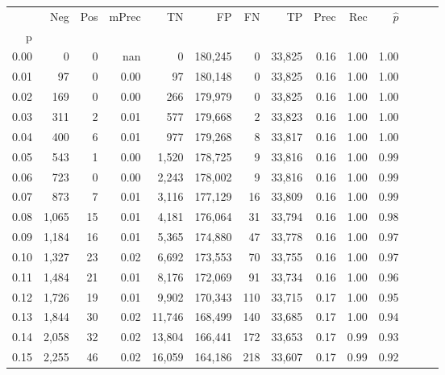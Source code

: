 \begin{tabular}{rrrrrrrrrrrrrr}
\toprule
{} &    Neg &  Pos & mPrec &       TN &       FP &      FN &      TP &  Prec &   Rec & $\hat{p}$ \\
p    &        &      &       &          &          &         &         &       &       &           \\
\midrule
0.00 &      0 &    0 &   nan &        0 &  180,245 &       0 &  33,825 &  0.16 &  1.00 &      1.00 \\
0.01 &     97 &    0 &  0.00 &       97 &  180,148 &       0 &  33,825 &  0.16 &  1.00 &      1.00 \\
0.02 &    169 &    0 &  0.00 &      266 &  179,979 &       0 &  33,825 &  0.16 &  1.00 &      1.00 \\
0.03 &    311 &    2 &  0.01 &      577 &  179,668 &       2 &  33,823 &  0.16 &  1.00 &      1.00 \\
0.04 &    400 &    6 &  0.01 &      977 &  179,268 &       8 &  33,817 &  0.16 &  1.00 &      1.00 \\
0.05 &    543 &    1 &  0.00 &    1,520 &  178,725 &       9 &  33,816 &  0.16 &  1.00 &      0.99 \\
0.06 &    723 &    0 &  0.00 &    2,243 &  178,002 &       9 &  33,816 &  0.16 &  1.00 &      0.99 \\
0.07 &    873 &    7 &  0.01 &    3,116 &  177,129 &      16 &  33,809 &  0.16 &  1.00 &      0.99 \\
0.08 &  1,065 &   15 &  0.01 &    4,181 &  176,064 &      31 &  33,794 &  0.16 &  1.00 &      0.98 \\
0.09 &  1,184 &   16 &  0.01 &    5,365 &  174,880 &      47 &  33,778 &  0.16 &  1.00 &      0.97 \\
0.10 &  1,327 &   23 &  0.02 &    6,692 &  173,553 &      70 &  33,755 &  0.16 &  1.00 &      0.97 \\
0.11 &  1,484 &   21 &  0.01 &    8,176 &  172,069 &      91 &  33,734 &  0.16 &  1.00 &      0.96 \\
0.12 &  1,726 &   19 &  0.01 &    9,902 &  170,343 &     110 &  33,715 &  0.17 &  1.00 &      0.95 \\
0.13 &  1,844 &   30 &  0.02 &   11,746 &  168,499 &     140 &  33,685 &  0.17 &  1.00 &      0.94 \\
0.14 &  2,058 &   32 &  0.02 &   13,804 &  166,441 &     172 &  33,653 &  0.17 &  0.99 &      0.93 \\
0.15 &  2,255 &   46 &  0.02 &   16,059 &  164,186 &     218 &  33,607 &  0.17 &  0.99 &      0.92 \\

\end{tabular}
